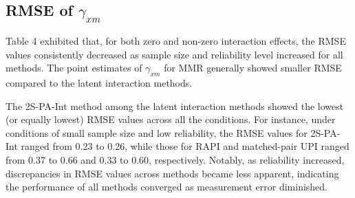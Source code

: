 \documentclass[
  man,mask]{apa6}
\begin{document}
\subsection{\texorpdfstring{RMSE of \(\gamma_{xm}\)}{RMSE of \textbackslash gamma\_\{xm\}}}\label{rmse-of-gamma_xm}

Table 4 exhibited that, for both zero and non-zero interaction effects, the RMSE values consistently decreased as sample size and reliability level increased for all methods. The point estimates of \(\gamma_{xm}\) for MMR generally showed smaller RMSE compared to the latent interaction methods.

The 2S-PA-Int method among the latent interaction methods showed the lowest (or equally lowest) RMSE values across all the conditions. For instance, under conditions of small sample size and low reliability, the RMSE values for 2S-PA-Int ranged from 0.23 to 0.26, while those for RAPI and matched-pair UPI ranged from 0.37 to 0.66 and 0.33 to 0.60, respectively. Notably, as reliability increased, discrepancies in RMSE values across methods became less apparent, indicating the performance of all methods converged as measurement error diminished.
\end{document}
